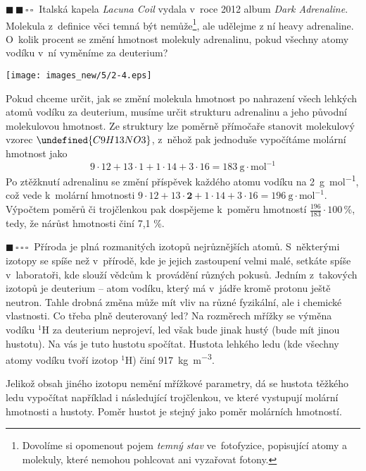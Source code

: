 \documentclass{book}
\let\ch\undefined
\newcommand{\jeden}{$\blacksquare \, \square \, \square \, \square \; \; $}
\newcommand{\dva}{$\blacksquare \, \blacksquare \, \square \, \square \; \; $}
\renewenvironment{quotation}{\par}{\par} %
\begin{document}
\hrulefill %
\begin{quotation}
\dva Italská kapela \textit{Lacuna Coil }vydala v~roce 2012 album \textit{Dark
Adrenaline}. Molekula z~definice věci temná být nemůže\footnote{Dovolíme si opomenout pojem \textit{temný stav} ve~fotofyzice, popisující atomy a molekuly, které nemohou pohlcovat ani vyzařovat fotony.}, ale udělejme
z ní heavy adrenaline. O~kolik procent se změní hmotnost molekuly
adrenalinu, pokud všechny atomy vodíku v~ní vyměníme za deuterium? 
\begin{center}
\texttt{[image: images\_new/5/2-4.eps]}
\par\end{center}

\end{quotation} \dotfill \par 
Pokud chceme určit, jak se změní molekula hmotnost po nahrazení všech
lehkých atomů vodíku za deuterium, musíme určit strukturu adrenalinu
a jeho původní molekulovou hmotnost. Ze struktury lze poměrně
přímočaře stanovit molekulový vzorec $\ch{C9H13NO3}$, z~něhož pak
jednoduše vypočítáme molární hmotnost jako 
\[
9\cdot12+13\cdot1+1\cdot14+3\cdot16=183\mathrm{\ g\cdot mol^{-1}}
\]
Po ztěžknutí adrenalinu se změní příspěvek každého atomu vodíku na
\SI[inter-unit-product = \ensuremath{{}\cdot{}}]{2}{\gram\per\mole}, což vede k~molární hmotnosti
$9\cdot12+13\cdot\textbf{2}+1\cdot14+3\cdot16=196\mathrm{\ g\cdot mol^{-1}}$.
Výpočtem poměrů či trojčlenkou pak dospějeme k~poměru
hmotností $\frac{196}{183}\cdot100\,\%$, tedy, že
nárůst hmotnosti činí 7,1 \%.


\hrulefill %
\begin{quotation}
\jeden Příroda je plná rozmanitých izotopů nejrůznějších atomů. S~některými izotopy se spíše než v~přírodě, kde je jejich zastoupení velmi malé, setkáte spíše v~laboratoři, kde slouží vědcům k~provádění různých pokusů.
Jedním z~takových izotopů je deuterium -- atom vodíku, který má v~jádře kromě protonu ještě neutron. Tahle drobná změna může mít vliv na různé fyzikální, ale i chemické vlastnosti. Co třeba plně deuterovaný led? Na rozměrech mřížky se výměna vodíku $\mathrm{^1 H}$ za deuterium neprojeví, led však bude jinak hustý (bude mít jinou hustotu). Na vás je tuto hustotu spočítat. Hustota lehkého ledu (kde všechny atomy vodíku tvoří izotop $\mathrm{^1 H}$) činí \SI[inter-unit-product = \ensuremath{{}\cdot{}}]{917}{\kg\per\cubic\metre}. 
\end{quotation} \dotfill \par 
Jelikož obsah jiného izotopu nemění mřížkové parametry, dá se hustota
těžkého ledu vypočítat například i následující trojčlenkou, ve které vystupují
molární hmotnosti a hustoty. Poměr hustot je stejný jako poměr molárních
hmotností.
\end{document}
